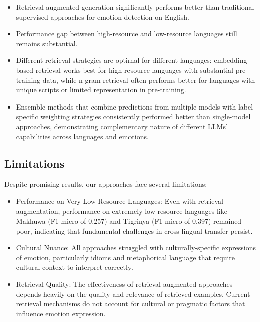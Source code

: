 \documentclass[a4paper,12pt]{extarticle}
\begin{document}
\begin{itemize}
    \item Retrieval-augmented generation significantly performs better than traditional supervised approaches for emotion detection on English.
    
    \item Performance gap between high-resource and low-resource languages still remains substantial.
    
    \item Different retrieval strategies are optimal for different languages: embedding-based retrieval works best for high-resource languages with substantial pre-training data, while n-gram retrieval often performs better for languages with unique scripts or limited representation in pre-training.
    
    \item Ensemble methods that combine predictions from multiple models with label-specific weighting strategies consistently performed better than single-model approaches, demonstrating complementary nature of different LLMs' capabilities across languages and emotions.
    
\end{itemize}

\subsection{Limitations}

Despite promising results, our approaches face several limitations:

\begin{itemize}
    \item Performance on Very Low-Resource Languages: Even with retrieval augmentation, performance on extremely low-resource languages like Makhuwa (F1-micro of 0.257) and Tigrinya (F1-micro of 0.397) remained poor, indicating that fundamental challenges in cross-lingual transfer persist.
    
    \item Cultural Nuance: All approaches struggled with culturally-specific expressions of emotion, particularly idioms and metaphorical language that require cultural context to interpret correctly.
    
    \item Retrieval Quality: The effectiveness of retrieval-augmented approaches depends heavily on the quality and relevance of retrieved examples. Current retrieval mechanisms do not account for cultural or pragmatic factors that influence emotion expression.
    
\end{itemize}
\end{document}
